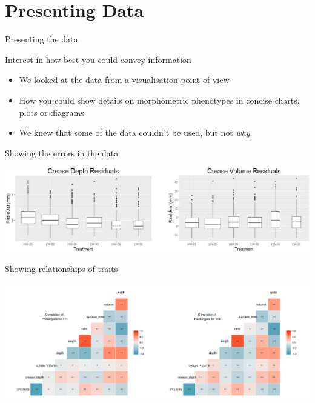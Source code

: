 \documentclass[t, aspectratio=169]{beamer}
\begin{document}
\section{Presenting Data}
\label{sec:orgcdfa26a}
\begin{frame}[label={sec:orgde30074}]{Presenting the data}
\begin{block}{Interest in how best you could convey information}
\begin{itemize}
\item We looked at the data from a visualisation point of view
\item How you could show details on morphometric phenotypes in concise charts, plots or diagrams
\item We knew that some of the data couldn't be used, but not \emph{why}
\end{itemize}
\end{block}
\end{frame}
\begin{frame}[label={sec:orgbc7f02a}]{Showing the errors in the data}
\begin{center}
\includegraphics[width=14cm]{./peter.png}
\end{center}
\end{frame}

\begin{frame}[label={sec:org38ae6dc}]{Showing relationships of traits}
\begin{center}
\includegraphics[width=14cm]{./corrmatrix.png}
\end{center}
\end{frame}
\end{document}
